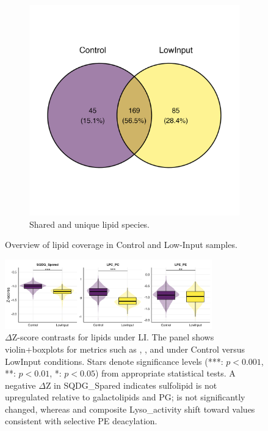 \documentclass[10pt,letterpaper]{article}
\begin{document}
\begin{figure}[htp]
  \begin{subfigure}[t]{0.55\textwidth}
    \centering
    \includegraphics[width=\linewidth]{fig/supp/SuppFig_3C_Lipid_Overlap_Venn}
    \caption{Shared and unique lipid species.}
    \label{fig:S3C}
  \end{subfigure}

  \caption{Overview of lipid coverage in Control and Low-Input samples.}
  \label{fig:S3}
\end{figure}


\begin{figure}[htp]
  \centering
  \includegraphics[width=0.8\textwidth]{fig/supp/SuppFig_4_lipid_ratio_linear_lowP.png}
  \caption{$\Delta$Z-score contrasts for lipids under LI. 
    The panel shows violin+boxplots for metrics such as , , and  under Control versus LowInput conditions. 
    Stars denote significance levels (***: $p<0.001$, **: $p<0.01$, *: $p<0.05$) from appropriate statistical tests. 
    A negative $\Delta$Z in SQDG\_Spared indicates sulfolipid is not upregulated relative to galactolipids and PG; 
     is not significantly changed, whereas  and composite Lyso\_activity shift toward values consistent with selective PE deacylation.}
  \label{fig:S4_lipid_ratio_lowP}
\end{figure}
\end{document}
